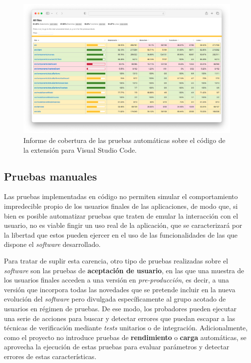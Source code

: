\begin{figure}[ht]
    \centering
    \includegraphics[width=\textwidth]{imagenes/utilizadas/4-4-verificacion/coverageExtensionFinal.png}
    \caption{Informe de cobertura de las pruebas automáticas sobre el código de la extensión para Visual Studio Code.}
    \label{fig:coberturaExtensionFinal}
\end{figure}

\subsection{Pruebas manuales}
\label{subsec:pruebasManuales}
Las pruebas implementadas en código no permiten simular el comportamiento impredecible propio de los usuarios finales de las aplicaciones, de modo que, si bien es posible automatizar pruebas que traten de emular la interacción con el usuario, no es viable fingir un uso real de la aplicación, que se caracterizará por la libertad que estos pueden ejercer en el uso de las funcionalidades de las que dispone el \textit{software} desarrollado.

Para tratar de suplir esta carencia, otro tipo de pruebas realizadas sobre el \textit{software} son las pruebas de \textbf{aceptación de usuario}, en las que una muestra de los usuarios finales acceden a una versión en \textit{pre-producción}, es decir, a una versión que incorpora todas las novedades que se pretende incluir en la nueva evolución del \textit{software} pero divulgada específicamente al grupo acotado de usuarios en régimen de pruebas. De ese modo, los probadores pueden ejecutar una serie de acciones para buscar y detectar errores que puedan escapar a las técnicas de verificación mediante \textit{tests} unitarios o de integración. Adicionalmente, como el proyecto no introduce pruebas de \textbf{rendimiento} o \textbf{carga} automáticas, se aprovecha la ejecución de estas pruebas para evaluar parámetros y detectar errores de estas características.

